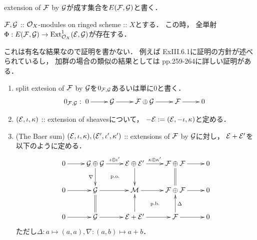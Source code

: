 \documentclass[a4paper]{jsarticle}
\makeatletter
\newcommand{\centerpb}{\ar@{}[lu]|{\text{p.b.}}}
\newcommand{\centerpo}{\ar@{}[lu]|{\text{p.o.}}}
\newcommand{\diag}{\Delta}
\newcommand{\codiag}{\nabla}
\makeatother
\begin{document}
    extension of $\mathcal{F}$ by $\mathcal{G}$が成す集合を$E(\mathcal{F}, \mathcal{G})$と書く．
    \begin{Thm}\label{thm:ExtAndExt1}
        $\mathcal{F}, \mathcal{G}$
        :: $\mathcal{O}_X$-modules on ringed scheme :: $X$とする．
        この時，
        全単射$\Phi: E(\mathcal{F}, \mathcal{G}) \to \operatorname{Ext}^1_{\mathcal{O}_X}(\mathcal{E}, \mathcal{G})$が存在する．
    \end{Thm}
    これは有名な結果なので証明を書かない．
    例えば\cite{HarAG} ExIII.6.1に証明の方針が述べられているし，
    加群の場合の類似の結果としては\cite{Shiho} pp.259-264に詳しい証明がある．

    \begin{Def}
        \begin{enumerate}[label=(\arabic*), leftmargin=*]
        \item
            split extesion of $\mathcal{F}$ by $\mathcal{G}$を$0_{\mathcal{F}, \mathcal{G}}$あるいは単に$0$と書く．
            \[
            0_{\shF, \shG}:
                \xymatrix{
                    0 \ar[r]& \shG \ar[r]& \shF \oplus \shG \ar[r]& \shF \ar[r]& 0
            }\]
            
        \item
            $(\mathcal{E}, \iota, \kappa)$ :: extension of sheavesについて，
            $-\mathcal{E}:=(\mathcal{E}, -\iota, \kappa)$と定める．

        \item
            (The Baer sum)
            $(\mathcal{E}, \iota, \kappa), (\mathcal{E}', \iota', \kappa')$
            :: extensions of $\mathcal{F}$ by $\mathcal{G}$に対し，
            $\mathcal{E}+\mathcal{E}'$を以下のように定める．
            \[\vcenter{\xymatrix{
                0 \ar[r]& \shG \oplus \shG \ar[r]^-{\iota \oplus \iota'}\ar[d]_-{\codiag}& \shE \oplus \shE' \ar[r]^-{\kappa \oplus \kappa'}\ar[d]& \shF \oplus \shF \ar[r]\ar@{=}[d]& 0\\
                0 \ar[r]& \shG \ar[r]& \shM \ar[r]\centerpo& \shF \oplus \shF\ar[r]& 0\\
                0 \ar[r]& \shG \ar[r]\ar@{=}[u]& \shE+\shE' \ar[r]\ar[u]& \shF \ar[r]\ar[u]_-{\diag}\centerpb& 0 \\
            }}\]
            ただし$\diag: a \mapsto (a,a), \codiag: (a,b) \mapsto a+b$．
    \end{enumerate}
    \end{Def}
    
\end{document}
